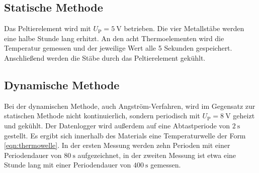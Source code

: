 \subsection{Statische Methode}
\label{sec:statische Methode}
Das Peltierelement wird mit $U_\text{P}=\SI{5}{\volt}$ betrieben.
Die vier Metallstäbe werden eine halbe Stunde lang erhitzt.
An den acht Thermoelementen wird die Temperatur gemessen und der jeweilige Wert alle 5 Sekunden gespeichert.
Anschließend werden die Stäbe durch das Peltierelement gekühlt.
%
\subsection{Dynamische Methode}
\label{sec:dynamische Methode}
Bei der dynamischen Methode, auch Angström-Verfahren, wird im Gegensatz zur statischen Methode nicht kontinuierlich,
sondern periodisch mit $U_\text{P}=\SI{8}{\volt}$ geheizt und gekühlt.
Der Datenlogger wird außerdem auf eine Abtastperiode von $\SI{2}{\second}$ gestellt.
Es ergibt sich innerhalb des Materials eine Temperaturwelle der Form \eqref{eqn:thermowelle}.
In der ersten Messung werden zehn Perioden mit einer Periodendauer von $\SI{80}{\second}$ aufgezeichnet,
in der zweiten Messung ist etwa eine Stunde lang mit einer Periodendauer von $\SI{400}{\second}$ gemessen.
